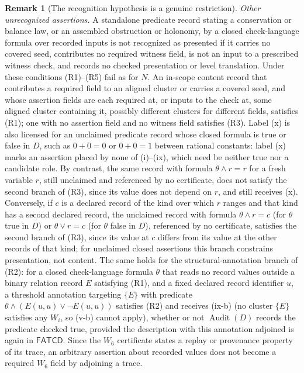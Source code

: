 \documentclass[11pt]{article}
\theoremstyle{definition}
\newtheorem{remark}[theorem]{Remark}
\newcommand{\FATCD}{\ensuremath{\mathsf{FATCD}}}
\newcommand{\Audit}[1]{\ensuremath{\operatorname{Audit}\!\left(#1\right)}}
\begin{document}
\begin{remark}[The recognition hypothesis is a genuine restriction]
\emph{Other unrecognized assertions.} A standalone predicate record stating a conservation or balance law, or an
assembled obstruction or holonomy, by a closed check-language formula over
recorded inputs is not recognized as presented if it carries no covered seed,
contributes no required witness field, is not an input to a prescribed witness
check, and records no checked presentation or level translation. Under these
conditions (R1)--(R5) fail as for \(N\).
An in-scope content record that contributes a required field to an aligned
cluster or carries a covered seed, and whose assertion fields are each required
at, or inputs to the check at, some aligned cluster containing it, possibly
different clusters for different fields, satisfies (R1); one with no assertion
field and no witness field satisfies (R3).
Label (x) is also licensed for an unclaimed predicate record whose closed
formula is true or false in \(D\), such as \(0+0=0\) or \(0+0=1\) between rational constants: label (x) marks an assertion placed
by none of (i)--(ix), which need be neither true nor a candidate role. By contrast, the same record
with formula \(\theta\wedge r=r\) for a fresh variable \(r\), still unclaimed and
referenced by no certificate, does not satisfy the second branch of (R3), since its value does not depend on
\(r\), and still receives (x). Conversely, if \(c\) is a declared record of the kind over which \(r\) ranges and that kind has a second declared record, the unclaimed record with formula \(\theta\wedge r=c\) (for \(\theta\) true in \(D\)) or \(\theta\vee r=c\) (for \(\theta\) false in \(D\)), referenced by no certificate, satisfies the second branch of (R3), since its value at \(c\) differs from its value at the other records of that kind; for unclaimed closed assertions this branch constrains presentation, not content. The same holds for the structural-annotation branch of (R2): for a closed check-language formula \(\theta\) that reads no record values outside a binary relation record \(E\) satisfying (R1), and a fixed declared record identifier \(u\), a threshold annotation targeting \(\{E\}\) with predicate \(\theta\wedge(E(u,u)\vee\neg E(u,u))\) satisfies (R2) and receives (ix-b) (no cluster \(\{E\}\) satisfies any \(W_i\), so (v-b) cannot apply), whether or not \(\Audit{D}\) records the predicate checked true, provided the description with this annotation adjoined is again in \FATCD{}. Since the
\(W_6\) certificate states a replay or provenance property of its trace, an
arbitrary assertion about recorded values does not become a required
\(W_6\) field by adjoining a trace.


\end{remark}
\end{document}
